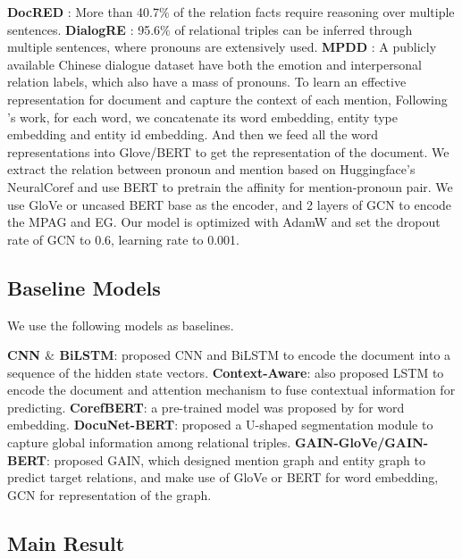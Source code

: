 \documentclass{article}
\begin{document}
\textbf{DocRED} \cite{yao2019docred}: More than 40.7$\%$ of the relation facts require reasoning over multiple sentences. \textbf{DialogRE} \cite{yu2020dialogue}: 95.6$\%$ of relational triples can be inferred through multiple sentences, where pronouns are extensively used. \textbf{MPDD} \cite{chen2020mpdd}: A publicly available Chinese dialogue dataset have both the emotion and interpersonal relation labels, which also have a mass of pronouns.
To learn an effective representation for document and capture the context of each mention, Following \cite{yao2019docred}’s work, for each word, we concatenate its word embedding, entity type embedding and entity id embedding. And then we feed all the word representations into Glove/BERT to get the representation of the document. We extract the relation between pronoun and mention based on Huggingface’s NeuralCoref and use BERT to pretrain the affinity for mention-pronoun pair. We 
use GloVe or uncased BERT base as the encoder, and 2 layers of GCN to encode the MPAG and EG. Our model is optimized with AdamW \cite{loshchilov2017decoupled} and set the dropout rate of GCN to 0.6, learning rate to 0.001.
\subsection{Baseline Models}
We use the following models as baselines.

\textbf{CNN $\&$ BiLSTM}: \cite{yao2019docred} proposed CNN and BiLSTM to encode the document into a sequence of the hidden state vectors. \textbf{Context-Aware}: \cite{yao2019docred} also proposed LSTM to encode the document and attention mechanism to fuse contextual information for predicting. \textbf{CorefBERT}: a pre-trained model was proposed by \cite{ye2020coreferential} for word embedding. \textbf{DocuNet-BERT}: \cite{zhang2021document} proposed a U-shaped segmentation module to capture global information among relational triples.
\textbf{GAIN-GloVe/GAIN-BERT}: \cite{zeng2020double} proposed GAIN, which designed mention graph and entity graph to predict target relations, and make use of GloVe or BERT for word embedding, GCN for representation of the graph. 

\subsection{Main Result}
\end{document}
